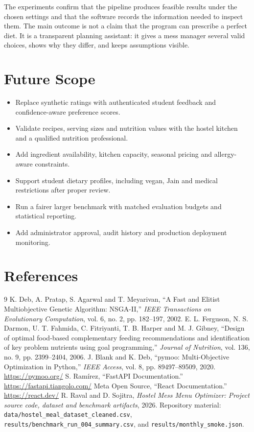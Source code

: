\documentclass[12pt,a4paper]{report}
\begin{document}
The experiments confirm that the pipeline produces feasible results under the chosen settings and that the software records the information needed to inspect them. The main outcome is not a claim that the program can prescribe a perfect diet. It is a transparent planning assistant: it gives a mess manager several valid choices, shows why they differ, and keeps assumptions visible.

\chapter{Future Scope}
\begin{itemize}
\item Replace synthetic ratings with authenticated student feedback and confidence-aware preference scores.
\item Validate recipes, serving sizes and nutrition values with the hostel kitchen and a qualified nutrition professional.
\item Add ingredient availability, kitchen capacity, seasonal pricing and allergy-aware constraints.
\item Support student dietary profiles, including vegan, Jain and medical restrictions after proper review.
\item Run a fairer larger benchmark with matched evaluation budgets and statistical reporting.
\item Add administrator approval, audit history and production deployment monitoring.
\end{itemize}

\chapter{References}
\begin{thebibliography}{9}
 K. Deb, A. Pratap, S. Agarwal and T. Meyarivan, ``A Fast and Elitist Multiobjective Genetic Algorithm: NSGA-II,'' \textit{IEEE Transactions on Evolutionary Computation}, vol. 6, no. 2, pp. 182--197, 2002.
 E. L. Ferguson, N. S. Darmon, U. T. Fahmida, C. Fitriyanti, T. B. Harper and M. J. Gibney, ``Design of optimal food-based complementary feeding recommendations and identification of key problem nutrients using goal programming,'' \textit{Journal of Nutrition}, vol. 136, no. 9, pp. 2399--2404, 2006.
 J. Blank and K. Deb, ``pymoo: Multi-Objective Optimization in Python,'' \textit{IEEE Access}, vol. 8, pp. 89497--89509, 2020. \url{https://pymoo.org/}
 S. Ram\'irez, ``FastAPI Documentation.'' \url{https://fastapi.tiangolo.com/}
 Meta Open Source, ``React Documentation.'' \url{https://react.dev/}
 R. Raval and D. Sojitra, \textit{Hostel Mess Menu Optimizer: Project source code, dataset and benchmark artifacts}, 2026. Repository material: \texttt{data/hostel\_meal\_dataset\_cleaned.csv}, \texttt{results/benchmark\_run\_004\_summary.csv}, and \texttt{results/monthly\_smoke.json}.
\end{thebibliography}
\end{document}
